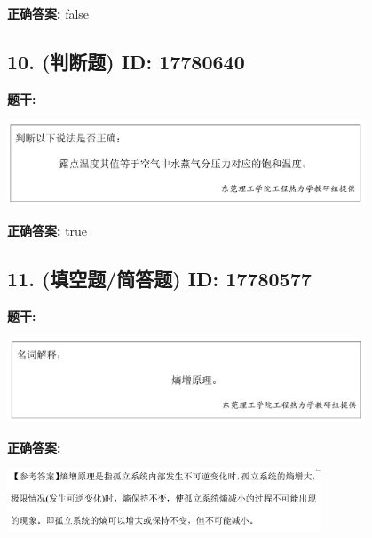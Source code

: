 \documentclass[12pt]{article}
\begin{document}
\textbf{正确答案:}
false

\vspace{0.5em}\hrulefill\vspace{1em}

\subsection*{10. (判断题) \small ID: 17780640}

\textbf{题干:}


\begin{center}\includegraphics[width=0.8\textwidth, height=0.25\textheight, keepaspectratio]{question_10_17780640/title_img_1.png}\end{center}

\textbf{正确答案:}
true

\vspace{0.5em}\hrulefill\vspace{1em}

\subsection*{11. (填空题/简答题) \small ID: 17780577}

\textbf{题干:}


\begin{center}\includegraphics[width=0.8\textwidth, height=0.25\textheight, keepaspectratio]{question_11_17780577/title_img_1.png}\end{center}

\textbf{正确答案:}

\begin{center}\includegraphics[width=0.7\textwidth, height=0.2\textheight, keepaspectratio]{question_11_17780577/correct_answer_1_img_1.png}\end{center}
\end{document}
